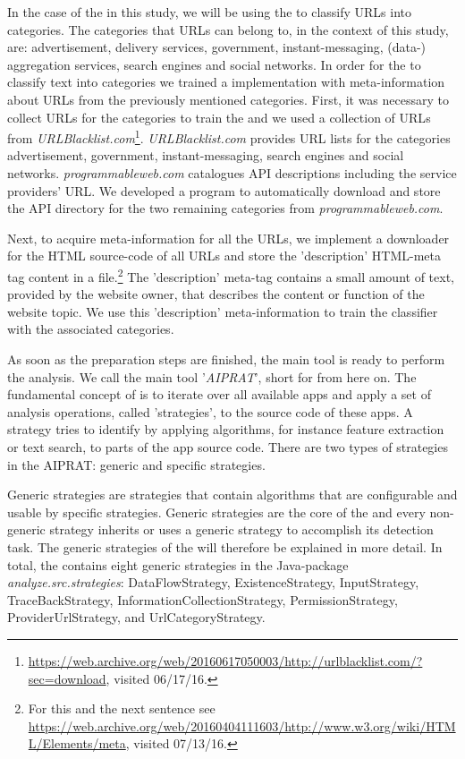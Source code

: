 In the case of the \sca in this study, we will be using the \nbc to classify URLs into categories.
The categories that URLs can belong to, in the context of this study, are: advertisement, delivery services, government, instant-messaging, (data-) aggregation services, search engines and social networks.
In order for the \nbc to classify text into categories we trained a \nbc implementation with meta-information about URLs from the previously mentioned categories.
First, it was necessary to collect URLs for the categories to train the \nbc and we used a collection of \acs{URL}s from \textit{URLBlacklist.com}\footnote{\raggedright \url{https://web.archive.org/web/20160617050003/http://urlblacklist.com/?sec=download}, visited 06/17/16.}.
\textit{URLBlacklist.com} provides URL lists for the categories advertisement, government, instant-messaging, search engines and social networks.
\textit{programmableweb.com} catalogues API descriptions including the service providers' URL.
We developed a program to automatically download and store the API directory for the two remaining categories from \textit{programmableweb.com}.

Next, to acquire meta-information for all the URLs, we implement a downloader for the HTML source-code of all URLs and store the 'description' HTML-meta tag content in a file.\footnote{For this and the next sentence see \url{https://web.archive.org/web/20160404111603/http://www.w3.org/wiki/HTML/Elements/meta}, visited 07/13/16.}
The 'description' meta-tag contains a small amount of text, provided by the website owner, that describes the content or function of the website topic.
We use this 'description' meta-information to train the classifier with the associated categories.\newline

As soon as the preparation steps are finished, the main \sca tool is ready to perform the \ipr analysis.
We call the main \sca tool '\textit{AIPRAT}', short for \aiprat from here on.
The fundamental concept of \AIPRAT is to iterate over all available apps and apply a set of analysis operations, called 'strategies', to the source code of these apps.
A strategy tries to identify \iprfs by applying algorithms, for instance feature extraction or text search, to parts of the app source code.
There are two types of strategies in the AIPRAT: generic and specific strategies.

Generic strategies are strategies that contain algorithms that are configurable and usable by specific strategies.
Generic strategies are the core of the \aiprat and every non-generic strategy inherits or uses a generic strategy to accomplish its \ipr detection task.
The generic strategies of the \aiprat will therefore be explained in more detail.
In total, the \aiprat contains eight generic strategies in the Java-package \textit{analyze.src.strategies}: DataFlowStrategy, ExistenceStrategy, InputStrategy, TraceBackStrategy, InformationCollectionStrategy, PermissionStrategy, ProviderUrlStrategy, and UrlCategoryStrategy.


